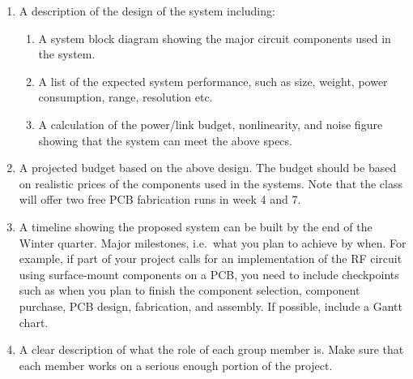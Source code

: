 \documentclass[letterpaper, 11pt]{article}
\begin{document}
\begin{enumerate}[itemsep=-0.1ex]
	
	\item A description of the design of the system including:
		\begin{enumerate}[itemsep=-0.1ex]
			\item A system block diagram showing the major circuit components used in the system.
			
			\item A list of the expected system performance, such as size, weight, power consumption, range, resolution etc. 
			
			\item A calculation of the power/link budget, nonlinearity, and noise figure showing that the system can meet the above specs. 
			
		\end{enumerate}
	
	\item A projected budget based on the above design. The budget should be based on realistic prices of the components used in the systems. Note that the class will offer two free PCB fabrication runs in week 4 and 7. 
	
	\item A timeline showing the proposed system can be built by the end of the Winter quarter. Major milestones, i.e.~what you plan to achieve by when. For example, if part of your project calls for an implementation of the RF circuit using surface-mount components on a PCB, you need to include checkpoints such as when you plan to finish the component selection, component purchase, PCB design, fabrication, and assembly. If possible, include a Gantt chart. 
	 
	\item A clear description of what the role of each group member is. Make sure that each member works on a serious enough portion of the project. 
\end{enumerate} 
\end{document}
